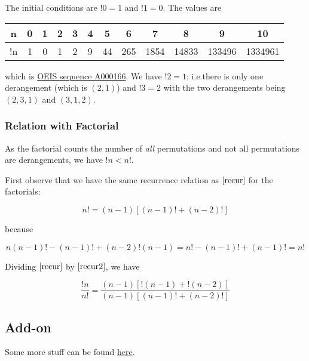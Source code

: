 The initial conditions are $!0=1$ and $!1=0$. The values are

\vspace*{2mm}

\begin{tabular}{c|ccccccccccc}
  n &  0 & 1 & 2 & 3 & 4 &  5 &   6 &   7 &     8 & 9 &           10 \\ \hline
  !n & 1 & 0 & 1 & 2 & 9 & 44 & 265 &1854 & 14833 & 133496 & 1334961 \\
\end{tabular}

\vspace*{2mm}

which is \href{https://oeis.org/A000166}{OEIS sequence A000166}. We have $!2 = 1$; i.e.there is only one derangement (which is $(2,1)$) and $!3 = 2$ with the two derangements being $(2,3,1)$ and $(3,1,2)$.

\subsubsection{Relation with Factorial}

As the factorial counts the number of \emph{all} permutations and not all permutations are derangements, we have $!n < n!$.

First observe that we have the same recurrence relation as \(\eqref{recur}\) for the factorials:

\begin{equation}
\label{recur2}
n!= (n-1) \left[ (n-1)! +  (n-2)!\right]
\end{equation}

because

\[
n(n-1)! - (n-1)! + (n-2)! (n-1) = n! - (n-1)! + (n-1)! = n!
\]

Dividing \(\eqref{recur}\) by \(\eqref{recur2}\), we have

\[
\frac{!n}{n!} = \frac{ (n-1) \left[ !(n-1) +  !(n-2)\right] }{ (n-1) \left[ (n-1)! +  (n-2)!\right] }
\]

\subsection{Add-on}

Some more stuff can be found
\href{http://math.ucr.edu/home/baez/qg-winter2004/derangement.pdf}{here}.

